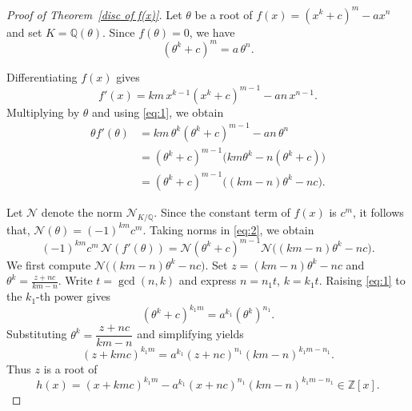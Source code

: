 \documentclass[table]{amsart}
\numberwithin{equation}{section}
\begin{document}
\begin{proof}[Proof of Theorem~\ref{disc of f(x)}]
Let $\theta$ be a root of $f(x)=(x^k+c)^m-ax^n$ and set $K=\mathbb{Q}(\theta)$. 
Since $f(\theta)=0$, we have
\begin{equation}\label{eq:1}
(\theta^k + c)^m = a\,\theta^n.
\end{equation}

Differentiating $f(x)$ gives
\[
f'(x)=km\,x^{k-1}(x^k+c)^{m-1}-an\,x^{n-1}.
\]
Multiplying by $\theta$ and using \eqref{eq:1}, we obtain
\begin{align}
\theta f'(\theta)
&=km\,\theta^k(\theta^k+c)^{m-1}-an\,\theta^n \nonumber\\
&=(\theta^k+c)^{m-1}\bigl(km\theta^k-n(\theta^k+c)\bigr)\nonumber\\
&=(\theta^k+c)^{m-1}\bigl((km-n)\theta^k-nc\bigr).
\label{eq:2}
\end{align}

Let $\mathcal{N}$ denote the norm $\mathcal{N}_{K/\mathbb{Q}}$. 
Since the constant term of $f(x)$ is $c^m$, it follows that, $\mathcal{N}(\theta)=(-1)^{km}c^m.$ Taking norms in \eqref{eq:2}, we obtain
\begin{equation}\label{eq:3}
(-1)^{km}c^m\,\mathcal{N}(f'(\theta))
=
\mathcal{N}(\theta^k+c)^{m-1}
\mathcal{N}\!\bigl((km-n)\theta^k-nc\bigr).
\end{equation}
We first compute $\mathcal{N}\!\bigl((km-n)\theta^k - nc\bigr)$. Set $z=(km-n)\theta^k-nc$ and $\theta^k=\frac{z+nc}{km-n}.$ Write $t=\gcd(n,k)$ and express $n=n_1t$, $k=k_1t$. Raising \eqref{eq:1} to the $k_1$-th power gives
\[
(\theta^k+c)^{k_1m}=a^{k_1}(\theta^k)^{n_1}.
\]
Substituting $\theta^k=\dfrac{z+nc}{km-n}$ and simplifying yields
\[
(z+kmc)^{k_1m}
=
a^{k_1}(z+nc)^{n_1}(km-n)^{k_1m-n_1}.
\]
Thus $z$ is a root of
\begin{equation}\label{eq:h}
h(x)
=
(x+kmc)^{k_1m}
-
a^{k_1}(x+nc)^{n_1}(km-n)^{k_1m-n_1}
\in\mathbb{Z}[x].
\end{equation}


\end{proof}
\end{document}
